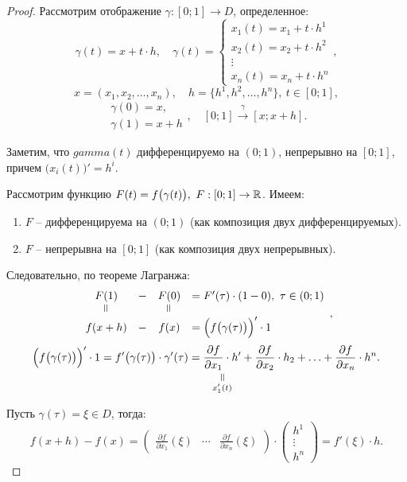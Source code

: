 \begin{proof}
    Рассмотрим отображение $ \gamma:[0;1]\rightarrow D $, определенное:
    \[
        \gamma(t) = x + t\cdot h, \quad \gamma(t) = \left\{\begin{array}{l}
            x_1(t) = x_1 + t\cdot h^1 \\
            x_2(t) = x_2 + t\cdot h^2 \\
            \vdots                    \\
            x_n(t) = x_n + t\cdot h^n
        \end{array}\right.,
    \]
    \[
        x = (x_1,x_2,\ldots,x_n),\quad h = \{h^1,h^2,\ldots,h^n\}, \ t\in [0;1],
    \]
    \[
        \begin{array}{l}
            \gamma(0) = x, \\
            \gamma(1) = x+h
        \end{array}, \quad [0;1]\overset{\gamma}{\longrightarrow}[x;x+h].
    \]

    Заметим, что $ gamma(t) $ дифференцируемо на $ (0;1) $, непрерывно на $ [0;1] $, причем $ \big(x_i(t)\big)' = h^i $.

    Рассмотрим функцию $ F(t) = f\big(\gamma(t)\big), \ F:[0;1]\rightarrow\mathbb{R} $. Имеем:
    \begin{enumerate}
        \item $ F $ -- дифференцируема на $ (0;1) $ (как композиция двух дифференцируемых).
        \item $ F $ -- непрерывна на $ [0;1] $ (как композиция двух непрерывных).
    \end{enumerate}

    Следовательно, по теореме Лагранжа:
    \[
        \begin{array}{cccl}
            F(1)    & - & F(0)    & = F'(\tau)\cdot(1-0), \ \tau \in (0;1)       \\
            \verteq &   & \verteq &                                              \\
            f(x+h)  & - & f(x)    & = \Big(f\big(\gamma(\tau)\big)\Big)' \cdot 1
        \end{array},
    \]
    \[
        \Big(f\big(\gamma(\tau)\big)\Big)' \cdot 1 = f'\big(\gamma(\tau)\big) \cdot \gamma'(\tau) = \equalto{\frac{\partial f}{\partial x_1} \cdot h'}{x_1'(t)} + \frac{\partial f}{\partial x_2}\cdot h_2 + \ldots + \frac{\partial f}{\partial x_n} \cdot h^n.
    \]

    Пусть $ \gamma(\tau) = \xi \in D $, тогда:
    \[
        f(x+h) - f(x) = \left(\begin{matrix}
                \frac{\partial f}{\partial x_1}(\xi) & \cdots & \frac{\partial f}{\partial x_n}(\xi)
            \end{matrix}\right) \cdot \left(\begin{matrix}
                h^1 \\ \vdots \\ h^n
            \end{matrix}\right) = f'(\xi)\cdot h.
    \]
\end{proof}

